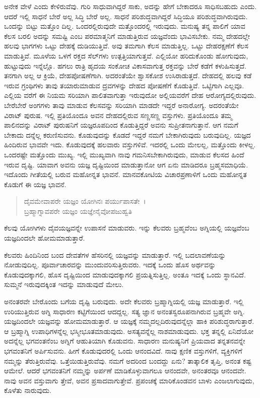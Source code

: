 ಅನೇಕ ವೇಳೆ  ಎಂದು ಕೇಳಿರುವೆವು. ಗುರಿ ಸಾಧುವಾಗಿದ್ದರೆ ಸಾಕು, ಅದನ್ನು ಹೇಗೆ ಬೇಕಾದರೂ ಸಾಧಿಸಬಹುದು ಎಂದು. ಆದರೆ ಇಲ್ಲಿ ಸಾಧನೆ ಬೇರೆ ಅಲ್ಲ ಸಿದ್ಧಿ ಬೇರೆ ಅಲ್ಲ. ಸಾಧನೆ ಪರಿಶುದ್ಧವಾಗಿದ್ದರೆ ಸಿದ್ಧಿಯೂ ಪರಿಶುದ್ಧವಾಗಿರುವುದು. ಒಂದನ್ನು ಬಿಟ್ಟು ಮತ್ತೊಂ ದಿಲ್ಲ. ಒಂದರಲ್ಲಿರುವುದೇ ಮತ್ತೊಂದರಲ್ಲಿ ಇರುವುದು. ಮನುಷ್ಯ ತನ್ನ ಪಾಲಿಗೆ ಯಾವ ಕೆಲಸ ಬರಲಿ ಅದನ್ನು ಸಮಷ್ಟಿ ಎಂಬ ಪರಮಾತ್ಮನಿಗೆ ಮಾಡುತ್ತಿರುವ ಯಜ್ಞವೆಂದು ಭಾವಿಸಬೇಕು. ನಮ್ಮ ದೇಹದಲ್ಲೇ ಹಲವು ಭಾಗಗಳು ಒಟ್ಟು ದೇಹಕ್ಕೆ ದುಡಿಯುತ್ತಿವೆ. ಅವು ತಮಗಾಗಿ ಕೆಲಸ ಮಾಡುತ್ತಿಲ್ಲ. ಒಟ್ಟು ದೇಹರಕ್ಷಣೆಗೆ ಕೆಲಸ ಮಾಡುತ್ತಿವೆ. ಮೂಳೆಯ ಒಳಗೆ ರಕ್ತದ ಸೆಲ್​ಗಳು ಉತ್ಪತ್ತಿಯಾಗುತ್ತವೆ. ಎಲ್ಲಿಯೋ ಹರಿದುಕೊಂಡು ಹೋಗುವುದು, ಹುಟ್ಟುವುದು ಇನ್ನೆಲ್ಲೊ. ಹಗಲು ರಾತ್ರಿ ಹೃದಯ ಸಂಕೋಚ ವಿಕಾಸವಾಗುತ್ತ ರಕ್ತವನ್ನು ಬೇರೆ ಕಡೆಗೆ ಕಳುಹಿಸುತ್ತದೆ. ತನಗಾಗಿ ಅಲ್ಲ ಆ ಕ್ರಿಯೆ, ದೇಹಪೋಷಣೆಗಾಗಿ. ಅದರಂತೆಯೇ ಶ್ವಾಸಕೋಶ ಉಸಿರಾಡುತ್ತದೆ. ದೇಹದಲ್ಲಿ ಹಲವು ಕಡೆ ಇರುವ ಗ್ರಂಥಿಗಳು  ತಾವು ತಯಾರುಮಾಡುವ ದ್ರವಗಳನ್ನು ದೇಹದ ಪೋಷಣೆಗೆ ಕೊಡುತ್ತಿವೆ. ಒಟ್ಟಿಗಾಗಿ ಎಲ್ಲವೂ. ಎಲ್ಲಿಯ ವರೆಗೆ ಈ ನಿಯಮ ಸರಿಯಾಗಿ ಪಾಲಿತವಾಗುತ್ತಾ ಇರುವುದೋ ಅಲ್ಲಿಯವರೆಗೆ ದೇಹ ಆರೋಗ್ಯದಲ್ಲಿರುವುದು. ಬೇರೆಬೇರೆ ಅಂಗಗಳು ತಾವು ಮಾಡುವ ಕೆಲಸವನ್ನು ಸರಿಯಾಗಿ ಮಾಡದೇ ಇದ್ದರೆ ಅನಾರೋಗ್ಯ. ಅದರಂತೆಯೇ ವಿರಾಟ್ ಪುರುಷ. ಇಲ್ಲಿ ಪ್ರತಿಯೊಂದೂ ಅವನ ದೇಹದಲ್ಲಿರುವ ಸಣ್ಣಸಣ್ಣ ವಸ್ತುಗಳು. ಪ್ರತಿಯೊಂದೂ ತಮ್ಮ ಪಾಲಿನದನ್ನು ವಿರಾಟ್ ಪುರುಷನಿಗೆ ಯಜ್ಞರೂಪದಿಂದ ಕೊಡುತ್ತಿದ್ದರೆ ಅವನು ಸುಪ್ರೀತನಾಗುತ್ತಾನೆ. ಆಗ ನಮಗೆ ಬೇಕಾದು ದನ್ನೆಲ್ಲ ಕರುಣಿಸುವನು. ಕೊಡುವುದನ್ನು ಕೊಡದೆ ಇದ್ದರೆ ನಮಗೆ ಬೇಕಾಗಿರುವುದು ಬರುವುದಿಲ್ಲ. ಯಜ್ಞದ ಹಿಂದಿರುವ ಭಾವವೇ ಇದು. ಕೊಡುವುದಕ್ಕೆ ಹಲವಾರು ವಸ್ತುಗಳಿವೆ. ಇದರಲ್ಲಿ ಒಂದು ಮೇಲಲ್ಲ, ಮತ್ತೊಂದು ಕೀಳಲ್ಲ. ಒಂದರಷ್ಟೇ ಮತ್ತೊಂದು ಮುಖ್ಯ. ಇಲ್ಲಿ ಮುಖ್ಯವಾಗಿ ನಾವು ಗಮನಿಸಬೇಕಾಗಿರುವುದು, ಮಾಡುವ ಕೆಲಸದ ಹಿಂದೆ ಇರುವ ದೃಷ್ಟಿ. ಯಾವಾಗ ಅವನು ಯಜ್ಞ ದೃಷ್ಟಿಯಿಂದ ಮಾಡುತ್ತಾನೋ ಆಗ ಏನು ಮಾಡಿದರೂ ಬ್ರಹ್ಮಸಮಾಧಿಯೆ. ಇದೊಂದು ಗೀತೆಯಲ್ಲಿ ಬರುವ ಮಹೋನ್ನತ ಭಾವನೆ. ಮಾನವಕೋಟಿಯ ವಿಚಾರಪ್ರಣಾಳಿಗೆ ಒಂದು ಮಹೋನ್ನತ ಕೊಡುಗೆ ಈ ಯಜ್ಞ ಭಾವನೆ.

\begin{verse}
ದೈವಮೇವಾಪರೇ ಯಜ್ಞಂ ಯೋಗಿನಃ ಪರ್ಯುಪಾಸತೇ~।\\ಬ್ರಹ್ಮಾಗ್ನಾವಪರೇ ಯಜ್ಞಂ ಯಜ್ಞೇನೈವೋಪಜುಹ್ವತಿ 
\end{verse}

{\small ಕೆಲವು ಯೋಗಿಗಳು ದೈವಯಜ್ಞವನ್ನೇ ಉಪಾಸನೆ ಮಾಡುವರು. ಇನ್ನು ಕೆಲವರು ಬ್ರಹ್ಮವೆಂಬ ಅಗ್ನಿಯಲ್ಲಿ ಯಜ್ಞವೆಂಬ ಯಜ್ಞದಿಂದಲೇ ಹೋಮಮಾಡುತ್ತಾರೆ.}

ಕೆಲವರು ಹಿಂದಿನಿಂದ ಬಂದ ದೇವತೆಗಳ ಹೆಸರಿನಲ್ಲಿ ಯಜ್ಞವನ್ನು ಮಾಡುತ್ತಾರೆ. ಇಲ್ಲಿ ಬದಲಾವಣೆಯನ್ನು ನೋಡುವುದಿಲ್ಲ. ಪೂರ್ವಾಚಾರವನ್ನು ಮುಂದುವರಿಸುತ್ತಿರುವರು. ಇದಕ್ಕೆ ಒಂದು ಹೊಸ ಅರ್ಥವನ್ನು ಕೊಡುವುದಕ್ಕಾಗಲಿ, ಹೊಸ ದೃಷ್ಟಿಯಿಂದ ಮಾಡುವುದಕ್ಕಾಗಲಿ ಪ್ರಯತ್ನಿಸುತ್ತಿಲ್ಲ. ಅಂತೂ ಇದಕ್ಕೆ ಒಂದು ಸ್ಥಾನವಿದೆ. ಸುಮ್ಮನೆ ಇರುವುದಕ್ಕಿಂತ ಇದನ್ನು ಮಾಡುವುದೆ ಮೇಲು.

ಅನಂತರವೇ ಬೇರೊಂದು ಬಗೆಯ ದೃಷ್ಟಿ ಬರುವುದು. ಅದೇ ಕೆಲವರು ಬ್ರಹ್ಮಾಗ್ನಿಯಲ್ಲಿ ಯಜ್ಞ ಮಾಡುತ್ತಾರೆ. ಇಲ್ಲಿ ಉರಿಯುತ್ತಿರುವ ಅಗ್ನಿ ಸಾಧಾರಣ ಕಟ್ಟಿಗೆಯಿಂದ ಆದದ್ದಲ್ಲ. ಸತ್ಯ ಜ್ಞಾನ ಅನಂತಸ್ವರೂಪನಾಗಿರುವ ಬ್ರಹ್ಮವೇ ಅಗ್ನಿ. ಯಜ್ಞದಿಂದಲೇ ಯಜ್ಞವನ್ನು ಹೋಮಮಾಡುತ್ತಾರೆ. ಆ ಯಜ್ಞಕ್ಕೆ ನಮ್ಮದಲ್ಲದಿರುವುದನ್ನೆಲ್ಲಾ ಹಾಕಿ ಪರಿಶುದ್ಧರಾಗುತ್ತಾರೆ. ಆ ಬ್ರಹ್ಮಾಗ್ನಿ ಉಪಾಧಿಗಳನ್ನೆಲ್ಲ ಭಸ್ಮೀಭೂತಮಾಡುವುದು. ಅಸತ್ಯವನ್ನೆಲ್ಲ ನಾಶಮಾಡುವುದು. ಭಕ್ತ ತನ್ನಲ್ಲಿ ಏನಿದೆಯೋ ಅದನ್ನೆಲ್ಲ ಭಗವಂತನೆಂಬ ಅಗ್ನಿಗೆ ಆಹುತಿಯಾಗಿ ಕೊಡುವನು. ಸಾಧಾರಣ ಮನುಷ್ಯನಿಗೆ ಪ್ರಿಯವಾದ ತನ್ನತನವನ್ನೇ ಭಗವಂತನಿಗೆ ಅರ್ಪಿಸುವನು. ಹೀಗೆ ಕೊಡುವುದರಲ್ಲಿ ಒಂದು ಆನಂದವಿದೆ. ನಾವು ಕ್ಷಣಿಕ ವಸ್ತುಗಳಿಗೆ, ವ್ಯಕ್ತಿಗಳಿಗೆ ನಮ್ಮನ್ನು ತೆರುತ್ತಿರುವೆವು. ಒತ್ತೆಯಿಡುತ್ತಿರುವೆವು. ನಮಗೆ ಅದರಿಂದ ಬಂದದ್ದು ಏನು? ತಾತ್ಕಾಲಿಕ ತೃಪ್ತಿ, ಅನಂತ ಕಷ್ಟ ಆಮೇಲೆ. ಆದರೆ ಭಗವಂತನಿಗೆ ನಮ್ಮನ್ನು ಅರ್ಪಣೆ ಮಾಡಿಕೊಳ್ಳುವಾಗಲೂ ಆನಂದವೇ, ಅನಂತರವೂ ಆನಂದವೇ. ನಾವು ಅವನ ವಸ್ತುವಾಗು ತ್ತೇವೆ, ಅವನ ಪ್ರಸಾದವಾಗುತ್ತೇವೆ. ಪ್ರಪಂಚಕ್ಕೆ ಮಾರಿಕೊಂಡವನ ಬಾಳು ಎಂಜಲಾಗುವುದು, ಕೊಳೆತು ನಾರುವುದು.

